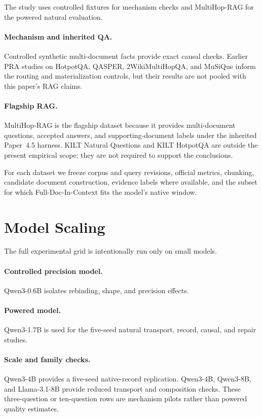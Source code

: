\documentclass[11pt]{article}
\begin{document}
The study uses controlled fixtures for mechanism checks and MultiHop-RAG for
the powered natural evaluation.

\paragraph{Mechanism and inherited QA.}
Controlled synthetic multi-document facts provide exact causal checks. Earlier
PRA studies on HotpotQA, QASPER, 2WikiMultiHopQA, and MuSiQue inform the routing
and materialization controls, but their results are not pooled with this paper's
RAG claims.

\paragraph{Flagship RAG.}
MultiHop-RAG is the flagship dataset because it provides multi-document
questions, accepted answers, and supporting-document labels under the inherited
Paper~4.5 harness. KILT Natural Questions and KILT HotpotQA are outside the
present empirical scope; they are not required to support the conclusions.

For each dataset we freeze corpus and query revisions, official metrics, chunking, candidate document construction, evidence labels where available, and the subset for which Full-Doc-In-Context fits the model's native window.

\section{Model Scaling}

The full experimental grid is intentionally run only on small models.

\paragraph{Controlled precision model.}
Qwen3-0.6B isolates rebinding, shape, and precision effects.

\paragraph{Powered model.}
Qwen3-1.7B is used for the five-seed natural transport, record, causal, and
repair studies.

\paragraph{Scale and family checks.}
Qwen3-4B provides a five-seed native-record replication. Qwen3-4B, Qwen3-8B,
and Llama-3.1-8B provide reduced transport and composition checks. These
three-question or ten-question rows are mechanism pilots rather than powered
quality estimates.
\end{document}
